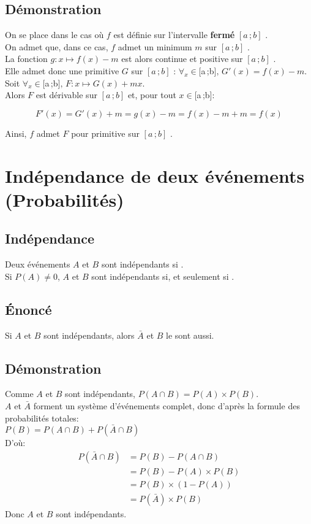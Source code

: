 \documentclass[12px]{article}
\newcommand\I{$[a\,;b]$ }
\begin{document}
	\subsection{Démonstration}
	On se place dans le cas où $f$ est définie sur l'intervalle \textbf{fermé} \I.\\
	On admet que, dans ce cas, $f$ admet un minimum $m$ sur \I.\\
	La fonction $g:x\mapsto f(x)-m$ est alors continue et positive sur \I.\\
	Elle admet donc une primitive $G$ sur \I : $\forall_{x} \in \I, \, G'(x) = f(x) -m$.\\
	Soit $\forall_{x} \in \I, \, F: x \mapsto G(x) + mx$.\\
	Alors $F$ est dérivable sur \I et, pour tout $x \in \I$:
	\begin{center}
		\begin{displaymath}
			F'(x) = G'(x) + m = g(x) - m = f(x) -m +m = f(x)
		\end{displaymath}
	\end{center}
	Ainsi, $f$ admet $F$ pour primitive sur \I.
	
	\section{Indépendance de deux événements (Probabilités)}
	
	\subsection{Indépendance}
	Deux événements $A$ et $B$ sont indépendants si .\\
	Si $P(A)\not=0$, $A$ et $B$ sont indépendants si, et seulement si .
	
	\subsection{\'Enoncé}
	Si $A$ et $B$ sont indépendants, alors $\bar{A}$ et $B$ le sont aussi.
	
	\subsection{Démonstration}
	Comme $A$ et $B$ sont indépendants, $P(A\cap B) = P(A)\times P(B)$.\\
	$A$ et $\bar{A}$ forment un système d'événements complet, donc d'après la formule des probabilités totales:\\
	$P(B)= P(A\cap B) + P(\bar{A} \cap B)$\\
	D'où:
	\begin{align*}
	P(\bar{A}\cap B) &= P(B) - P(A\cap B)\\
	&= P(B) - P(A)\times P(B)\\
	&= P(B)\times (1-P(A))\\
	&= P(\bar{A})\times P(B)
	\end{align*}
	Donc $A$ et $B$ sont indépendants.
	
\end{document}
